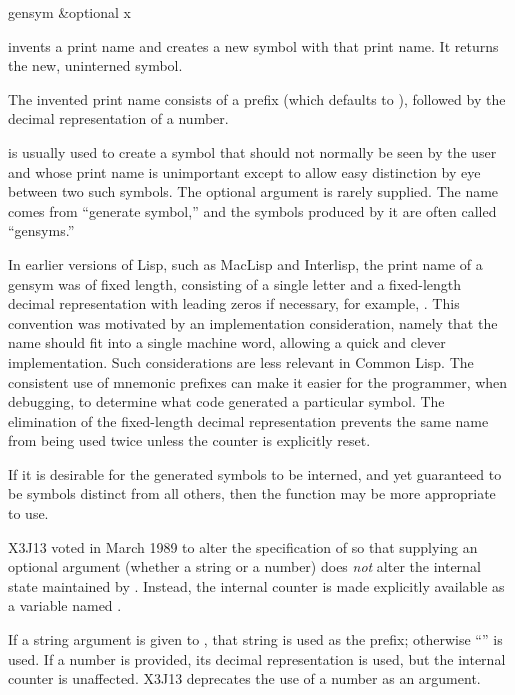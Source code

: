 \begin{defun}[Function]
gensym &optional x

 invents a print name and creates a new symbol with that print name.
It returns the new, uninterned symbol.

The invented print name consists of a prefix
(which defaults to ), followed by the decimal representation of a number.

 is usually used to create a symbol that should not normally
be seen by the user and whose print name is unimportant except to
allow easy distinction by eye between two such symbols.
The optional argument is rarely supplied.
The name comes from ``generate symbol,'' and the symbols produced by it
are often called ``gensyms.''

\beforenoterule
\begin{incompatibility}
In earlier versions of Lisp, such as MacLisp and
Interlisp, the print name of a gensym was of fixed length, consisting
of a single letter and a fixed-length
decimal representation with leading zeros
if necessary, for example, .  This convention was
motivated by an implementation consideration, namely that the name
should fit into a single machine word, allowing a quick and clever
implementation.  Such considerations are less relevant in Common Lisp.
The consistent use of mnemonic prefixes can make it easier
for the programmer, when debugging, to determine what code generated
a particular symbol.  The elimination of the fixed-length decimal
representation prevents the same name from being used twice
unless the counter is explicitly reset.
\end{incompatibility}
\afternoterule

If it is desirable
for the generated symbols to be interned, and yet guaranteed to be
symbols distinct from all others,
then the function 
may be more appropriate to use.

\begin{newer}
X3J13 voted in March 1989 
to alter the specification of  so that supplying an
optional argument (whether a string or a number) does \emph{not} alter
the internal state maintained by .
Instead, the internal
counter is made explicitly available as a variable named .

If a string argument is given to , that string is used as the prefix;
otherwise ``'' is used.  If a number is provided, its decimal
representation is used, but the internal counter is unaffected.
X3J13 deprecates the use of a number as an argument.
\end{newer}
\end{defun}


